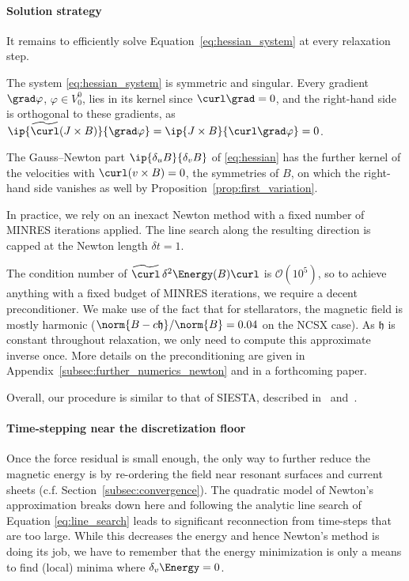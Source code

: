 \documentclass[%
 reprint,
 superscriptaddress,
 amsmath,amssymb,
 aps, nofootinbib, floatfix]{revtex4-2}
\begin{document}
\paragraph{Solution strategy}

It remains to efficiently solve Equation~\eqref{eq:hessian_system} at every relaxation step.
\begin{lemma}
    \label{lem:newton_consistent}
    The system \eqref{eq:hessian_system} is symmetric and singular. Every gradient $\grad \varphi$, $\varphi \in V^0_0$, lies in its kernel since $\curl \grad = 0$, and the right-hand side is orthogonal to these gradients, as $\ip{\widetilde{\curl} (J \times B)}{\grad \varphi} = \ip{J \times B}{\curl \grad \varphi} = 0$. 
    
    The Gauss--Newton part $\ip{\delta_u B}{\delta_v B}$ of \eqref{eq:hessian} has the further kernel of the velocities with $\curl(v \times B) = 0$, the symmetries of $B$, on which the right-hand side vanishes as well by Proposition~\ref{prop:first_variation}.
\end{lemma}

In practice, we rely on an inexact Newton method \citep[Section 7.1]{nocedal_numerical_2006} with a fixed number of MINRES iterations applied. The line search along the resulting direction is capped at the Newton length $\delta t = 1$.

The condition number of $\widetilde{\curl} \, \delta^2 \Energy(B) \curl$ is $\mathcal O(10^5)$, so to achieve anything with a fixed budget of MINRES iterations, we require a decent preconditioner. We make use of the fact that for stellarators, the magnetic field is mostly harmonic ($\norm{B - c \mathfrak h} / \norm{B} = 0.04$ on the NCSX case). As $\mathfrak h$ is constant throughout relaxation, we only need to compute this approximate inverse once. More details on the preconditioning are given in Appendix~\ref{subsec:further_numerics_newton} and in a forthcoming paper.

Overall, our procedure is similar to that of SIESTA, described in~\citep[Section IX.A]{hirshman_siesta_2011} and~\cite{hirshman_bcyclic_2010}. 

\paragraph{Time-stepping near the discretization floor}

Once the force residual is small enough, the only way to further reduce the magnetic energy is by re-ordering the field near resonant surfaces and current sheets (c.f. Section~\ref{subsec:convergence}). The quadratic model of Newton's approximation breaks down here and following the analytic line search of Equation \eqref{eq:line_search} leads to significant reconnection from time-steps that are too large. While this decreases the energy and hence Newton's method is doing its job, we have to remember that the energy minimization is only a means to find (local) minima where $\delta_v \Energy = 0$.
\end{document}
